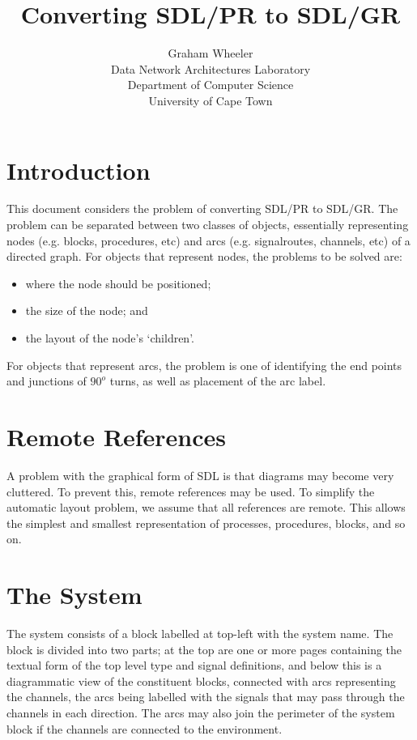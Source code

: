 
\title{Converting SDL/PR to SDL/GR}
\author{Graham Wheeler\\
Data Network Architectures Laboratory\\
Department of Computer Science\\
University of Cape Town}
\maketitle

\section{Introduction}

This document considers the problem of converting SDL/PR to
SDL/GR. The problem can be separated between two classes of
objects, essentially representing nodes (e.g. blocks, procedures,
etc) and arcs (e.g. signalroutes, channels, etc) of a directed
graph. For objects that represent nodes, the problems to be solved
are:

\begin{itemize}
\item where the node should be positioned;
\item the size of the node; and
\item the layout of the node's `children'.
\end{itemize}

For objects that represent arcs, the problem is one of identifying
the end points and junctions of $90^o$ turns, as well as placement
of the arc label.

\section{Remote References}

A problem with the graphical form of SDL is that diagrams may become
very cluttered. To prevent this, remote references may be used. To
simplify the automatic layout problem, we assume that all references
are remote. This allows the simplest and smallest representation of
processes, procedures, blocks, and so on.

\section{The System}

The system consists of a block labelled at top-left with the system
name. The block is divided into two parts; at the top are one or more
pages containing the textual form of the top level type and signal
definitions, and 
below this is a diagrammatic view of the constituent blocks,
connected with arcs representing the channels, the arcs being 
labelled with the signals that may pass through the channels
in each direction. The arcs may also join the perimeter of the
system block if the channels are connected to the environment.

